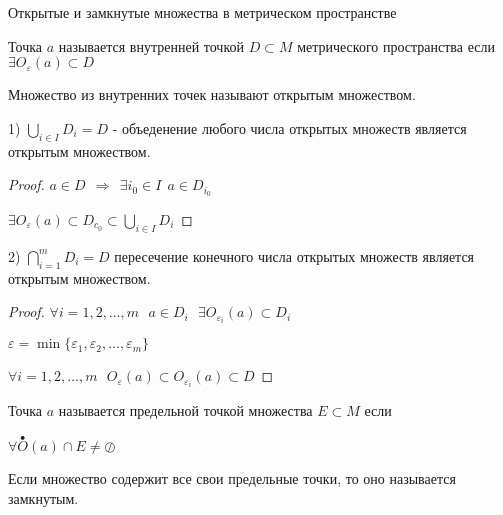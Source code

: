 \begin{title}[\Large]
  Открытые и замкнутые множества в метрическом пространстве
\end{title}

\begin{define}
  Точка $a$ называется внутренней точкой $D \subset M$ метрического
  пространства если  $\exists O_{\varepsilon}(a) \subset D$
\end{define}

\begin{define}
  Множество из внутренних точек называют открытым множеством.
\end{define}

\begin{block}[Свойства]
  1) $\bigcup_{i \in I} D_i = D$ - объеденение любого числа открытых множеств
  является открытым множеством.

  \begin{proof}
    $a \in D ~~ \Rightarrow ~~ \exists i_0 \in I ~~ a \in D_{i_0}$

    $\exists O_{\varepsilon}(a) \subset D_{c_0} \subset \bigcup_{i \in I} D_i$
  \end{proof}

  2) $\bigcap_{i=1}^m D_i = D$ пересечение конечного числа открытых
  множеств является открытым множеством.

  \begin{proof}
    $\forall i = 1, 2, \ldots, m ~~~ a \in D_i ~~~
    \exists O_{\varepsilon_i}(a) \subset D_i$

    $\varepsilon = \min \{\varepsilon_1, \varepsilon_2, \ldots, \varepsilon_m\}$

    $\forall i = 1, 2, \ldots, m ~~~
    O_{\varepsilon}(a) \subset O_{\varepsilon_i}(a) \subset D$
  \end{proof}
\end{block}

\begin{define}
  Точка $a$ называется предельной точкой множества $E \subset M$ если

  $\forall \stackrel{\bullet}{O}(a) \cap E \not= \oslash$
\end{define}

\begin{define}
  Если множество содержит все свои предельные точки, то оно называется
  замкнутым.
\end{define}

